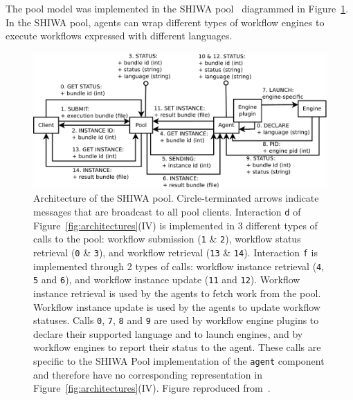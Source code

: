 \documentclass[preprint,3p,twocolumn]{elsarticle}
\newcommand{\note}[2]{\pdfmargincomment[color=yellow,author=#1,open=true]{#2}}
\newcommand{\closednote}[4]{} %
\begin{document}
The pool model was implemented in the SHIWA pool~\cite{ROGE-13}
diagrammed in Figure~\ref{fig:shiwa-pool-architecture}. In the SHIWA
pool, agents can wrap different types of workflow engines to execute
workflows expressed with different languages.

\begin{figure}
\centering
\includegraphics[width=1.5\columnwidth]{figures/pool-interactions.pdf}
\caption{Architecture of the SHIWA pool. Circle-terminated arrows
  indicate messages that are broadcast to all pool
  clients. Interaction \texttt{d} of Figure~\ref{fig:architectures}(IV) is
  implemented in 3 different types of calls to the pool: workflow
  submission (\texttt{1} \& \texttt{2}), workflow status retrieval
  (\texttt{0} \& \texttt{3})\closednote{sorina}{I suppose letters come
    here from the initial pool-model figure; it's a bit puzzling when
    mixed with letters from Fig 2}{Tristan}{Fixed.}, and workflow
  retrieval (\texttt{13} \& \texttt{14}). \closednote{Marc-e}{Maybe
    easier to follow if the following would be in fig legend instead
    of here, as for 2 previous figures}{Tristan}{fixed} Interaction
  \texttt{f} is implemented through 2 types of calls: workflow
  instance retrieval (\texttt{4}, \texttt{5} and \texttt{6}), and
  workflow instance update (\texttt{11} and \texttt{12}). Workflow
  instance retrieval is used by the agents to fetch work from the
  pool. Workflow instance update is used by the agents to update
  workflow statuses.  Calls \texttt{0}, \texttt{7}, \texttt{8} and
  \texttt{9} are used by
  workflow engine plugins to declare their supported language and to
  launch engines, and by workflow engines to report their status to
  the agent. These calls are specific to the SHIWA Pool implementation
  of the \texttt{agent} component and therefore have no corresponding
  representation in Figure~\ref{fig:architectures}(IV). Figure reproduced
  from~\cite{ROGE-13}.}
\label{fig:shiwa-pool-architecture}
\end{figure}
\end{document}
